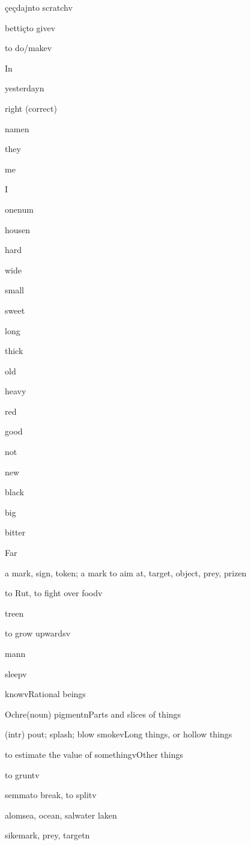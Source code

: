 \documentclass[12pt,a4paper,twoside]{article}
\begin{document}
\begin{multicols}{2}
{çeçdajn}{to scratch}{v}{}

{bettiç}{to give}{v}{}

{}{to do/make}{v}{}

{}{In}{}{}

{}{yesterday}{n}{}

{}{right (correct)}{}{}

{}{name}{n}{}

{}{they}{}{}

{}{me}{}{}

{}{I}{}{}

{}{one}{num}{}

{}{house}{n}{}

{}{hard}{}{}

{}{wide}{}{}

{}{small}{}{}

{}{sweet}{}{}

{}{long}{}{}

{}{thick}{}{}

{}{old}{}{}

{}{heavy}{}{}

{}{red}{}{}

{}{good}{}{}

{}{not}{}{}

{}{new}{}{}

{}{black}{}{}

{}{big}{}{}

{}{bitter}{}{}

{}{Far}{}{}

{}{a mark, sign, token; a mark to aim at, target, object, prey, prize}{n}{}

{}{to Rut, to fight over food}{v}{}

{}{tree}{n}{}

{}{to grow upwards}{v}{}

{}{man}{n}{}

{}{sleep}{v}{}

{}{know}{v}{Rational beings}

{}{Ochre(noun) pigment}{n}{Parts and slices of things}

{}{(intr) pout; splash; blow smoke}{v}{Long things, or hollow things}

{}{to estimate the value of something}{v}{Other things}

{}{to grunt}{v}{}

{semma}{to break, to split}{v}{}

{alom}{sea, ocean, salwater lake}{n}{}

{sike}{mark, prey, target}{n}{}

\end{multicols}
\end{document}
